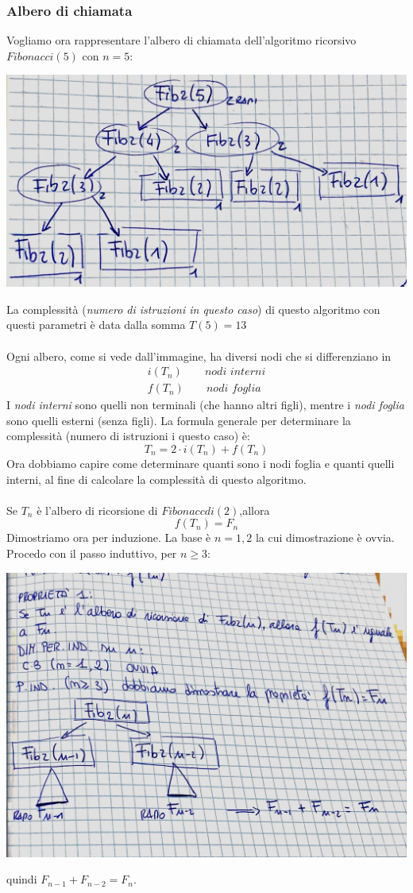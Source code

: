 \documentclass[italian]{article}
\begin{document}
\subsubsection{Albero di chiamata}
Vogliamo ora rappresentare l'albero di chiamata dell'algoritmo ricorsivo $Fibonacci(5)$ con $n=5$:
\begin{center}
	\includegraphics[width=0.5\linewidth]{images/albero-di-chiamata}
\end{center}
La complessità (\textit{numero di istruzioni in questo caso}) di questo algoritmo con questi parametri è data dalla somma $T(5) = 13$\\\\
Ogni albero, come si vede dall'immagine, ha diversi nodi che si differenziano in
\begin{gather*}
	i(T_n) \qquad \textit{nodi interni}\\
	f(T_n) \qquad \textit{nodi foglia}
\end{gather*}
I \textit{nodi interni} sono quelli non terminali (che hanno altri figli), mentre i \textit{nodi foglia} sono quelli esterni (senza figli). La formula generale per determinare la complessità (numero di istruzioni i questo caso) è:
\[
	T_n = 2\cdot i(T_n) + f(T_n)
\]
Ora dobbiamo capire come determinare quanti sono i nodi foglia e quanti quelli interni, al fine di calcolare la complessità di questo algoritmo. \\\\
Se $T_n$ è l'albero di ricorsione di $Fibonaccdi(2)$,allora
\[
	f(T_n) = F_n
\]
Dimostriamo ora per induzione. La base è $n=1,2$ la cui dimostrazione è ovvia. Procedo con il passo induttivo,  per $n\geq 3$:
\begin{center}
	\includegraphics[width=0.5\linewidth]{images/induzione-fibonacci}
\end{center}
quindi $F_{n-1} + F_{n-2} = F_n$.
\pagebreak
\end{document}
